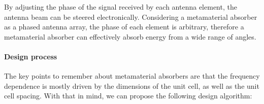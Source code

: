 By adjusting the phase of the signal received by each antenna element, the
antenna beam can be steered electronically. Considering a metamaterial absorber
as a phased antenna array, the phase of each element is arbitrary, therefore a
metamaterial absorber can effectively absorb energy from a wide range of angles.

\paragraph{Design process}

The key points to remember about metamaterial absorbers are that the frequency
dependence is mostly driven by the dimensions of the unit cell, as well as the
unit cell spacing. With that in mind, we can propose the following design
algorithm:

